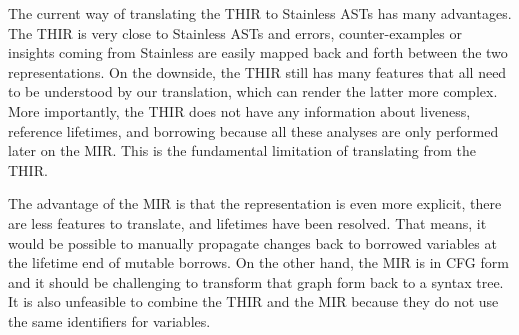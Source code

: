 The current way of translating the THIR to Stainless ASTs has many
advantages. The THIR is very close to Stainless ASTs and errors,
counter-examples or insights coming from Stainless are easily mapped
back and forth between the two representations. On the downside, the
THIR still has many features that all need to be understood by our
translation, which can render the latter more complex. More importantly,
the THIR does not have any information about liveness, reference
lifetimes, and borrowing because all these analyses are only performed
later on the MIR. This is the fundamental limitation of translating from
the THIR.

The advantage of the MIR is that the representation is even more
explicit, there are less features to translate, and lifetimes have been
resolved. That means, it would be possible to manually propagate changes
back to borrowed variables at the lifetime end of mutable borrows. On
the other hand, the MIR is in CFG form and it should be challenging to
transform that graph form back to a syntax tree. It is also unfeasible
to combine the THIR and the MIR because they do not use the same
identifiers for variables.
